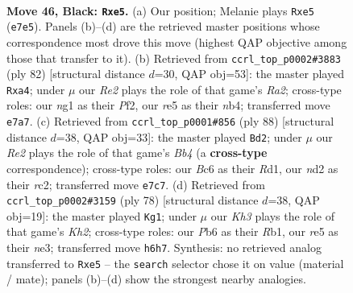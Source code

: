\documentclass[11pt]{article}
\begin{document}
\clearpage

\begin{figure}[p]\centering
\begin{subfigure}{0.46\textwidth}\centering
\resizebox{\linewidth}{!}{%
\newchessgame
\chessboard[
  setfen={1r6/4r3/1pb4k/p1p1R3/8/2P2pP1/1K1N3P/6NR b - - 0 46},
  showmover=false,
  pgfstyle=straightmove, color=movearrow, markmove={e7-e5}
]}
\caption{}
\end{subfigure}\hfill
\begin{subfigure}{0.46\textwidth}\centering
\resizebox{\linewidth}{!}{%
\newchessgame
\chessboard[
  setfen={6k1/1rB2pp1/1P2p3/8/rn1p4/3P3P/R4PP1/5K2 w - - 0 42},
  showmover=false,
  pgfstyle=straightmove, color=movearrow, markmove={a2-a4}
]}
\caption{}
\end{subfigure}
\\[4pt]
\begin{subfigure}{0.46\textwidth}\centering
\resizebox{\linewidth}{!}{%
\newchessgame
\chessboard[
  setfen={6k1/5p2/8/1Bb3p1/PB3n1p/7P/2r3P1/3R3K w - - 5 45},
  showmover=false,
  pgfstyle=straightmove, color=movearrow, markmove={b4-d2}
]}
\caption{}
\end{subfigure}\hfill
\begin{subfigure}{0.46\textwidth}\centering
\resizebox{\linewidth}{!}{%
\newchessgame
\chessboard[
  setfen={r5k1/6p1/1p1pN3/p2P4/2P3P1/1P2nr2/4R2K/1R6 w - - 1 40},
  showmover=false,
  pgfstyle=straightmove, color=movearrow, markmove={h2-g1}
]}
\caption{}
\end{subfigure}
\caption{\textbf{Move 46, Black: \texttt{Rxe5}.} (a) Our position; Melanie plays \texttt{Rxe5} (\texttt{e7e5}). Panels (b)--(d) are the retrieved master positions whose correspondence most drove this move (highest QAP objective among those that transfer to it). (b) Retrieved from \texttt{ccrl\_top\_p0002\#3883} (ply 82) [structural distance $d$=30, QAP obj=53]: the master played \texttt{Rxa4}; under $\mu$ our \emph{Re2} plays the role of that game's \emph{Ra2}; cross-type roles: our \emph{n}g1 as their \emph{P}f2, our \emph{r}e5 as their \emph{n}b4; transferred move \texttt{e7a7}. (c) Retrieved from \texttt{ccrl\_top\_p0001\#856} (ply 88) [structural distance $d$=38, QAP obj=33]: the master played \texttt{Bd2}; under $\mu$ our \emph{Re2} plays the role of that game's \emph{Bb4} (a \textbf{cross-type} correspondence); cross-type roles: our \emph{B}c6 as their \emph{R}d1, our \emph{n}d2 as their \emph{r}c2; transferred move \texttt{e7c7}. (d) Retrieved from \texttt{ccrl\_top\_p0002\#3159} (ply 78) [structural distance $d$=38, QAP obj=19]: the master played \texttt{Kg1}; under $\mu$ our \emph{Kh3} plays the role of that game's \emph{Kh2}; cross-type roles: our \emph{P}b6 as their \emph{R}b1, our \emph{r}e5 as their \emph{n}e3; transferred move \texttt{h6h7}. Synthesis: no retrieved analog transferred to \texttt{Rxe5} -- the \texttt{search} selector chose it on value (material / mate); panels (b)--(d) show the strongest nearby analogies.}
\label{fig:thought-m91}
\end{figure}
\end{document}
